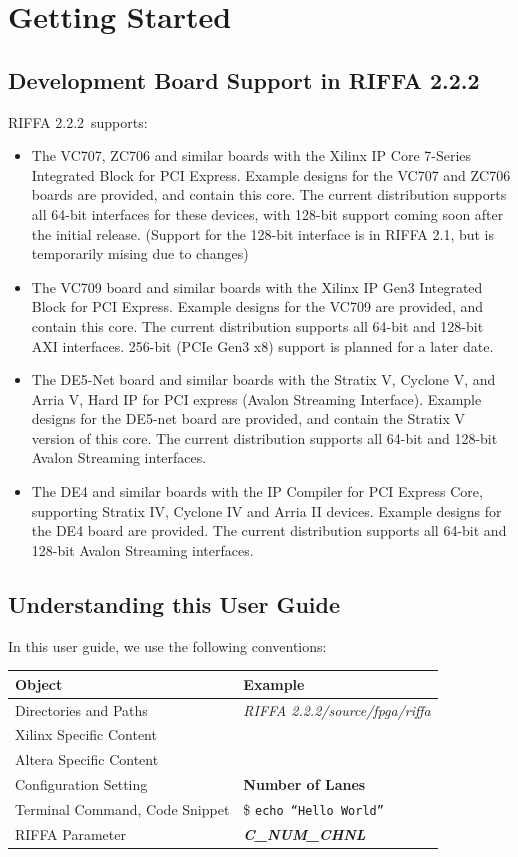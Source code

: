 \documentclass{refrep}
\newcommand{\RIFFAVer}{2.2.2}
\newcommand{\Directory}[1]{\textit{#1}}
\newcommand{\TermCmd}[1]{\$ \texttt{#1}}
\newcommand{\Xilinx}[1]{{\color{red}{#1}}}
\newcommand{\Altera}[1]{{\color{blue}{#1}}}
\newcommand{\ConfigSetting}[1]{\textbf{#1}}
\newcommand{\RIFFAParameter}[1]{\textit{\textbf{#1}}}
\begin{document}
\pagebreak
\chapter{Getting Started}
\section{Development Board Support in RIFFA \RIFFAVer}
RIFFA \RIFFAVer~supports:
\begin{itemize}
\item The VC707, ZC706 and similar boards with the Xilinx IP Core 7-Series
  Integrated Block for PCI Express. Example designs for the VC707 and ZC706
  boards are provided, and contain this core. The current distribution supports
  all 64-bit interfaces for these devices, with 128-bit support coming soon
  after the initial release. (Support for the 128-bit interface is in RIFFA 2.1,
  but is temporarily mising due to changes)
\item The VC709 board and similar boards with the Xilinx IP Gen3 Integrated
  Block for PCI Express. Example designs for the VC709 are provided, and contain
  this core. The current distribution supports all 64-bit and 128-bit AXI
  interfaces. 256-bit (PCIe Gen3 x8) support is planned for a later date.
\item The DE5-Net board and similar boards with the Stratix V, Cyclone V, and
  Arria V, Hard IP for PCI express (Avalon Streaming Interface). Example designs
  for the DE5-net board are provided, and contain the Stratix V version of this
  core. The current distribution supports all 64-bit and 128-bit Avalon
  Streaming interfaces.
\item The DE4 and similar boards with the IP Compiler for PCI Express Core,
  supporting Stratix IV, Cyclone IV and Arria II devices. Example designs for
  the DE4 board are provided. The current distribution supports all 64-bit and
  128-bit Avalon Streaming interfaces.
\end{itemize}
\section{Understanding this User Guide}
In this user guide, we use the following conventions:
\begin{center}
  \begin{tabular}{ | l | l |}
    \hline
    Object & Example \\ \hline
    Directories and Paths & \Directory{RIFFA \RIFFAVer/source/fpga/riffa}  \\ \hline
    Xilinx Specific Content & \Xilinx{vc709} \\ \hline
    Altera Specific Content & \Altera{de5} \\ \hline
    Configuration Setting & \ConfigSetting{Number of Lanes} \\ \hline
    Terminal Command, Code Snippet & \TermCmd{echo ``Hello World''}\\ \hline
    RIFFA Parameter & \RIFFAParameter{C\_NUM\_CHNL}\\\hline
  \end{tabular}
\end{center}
\end{document}

